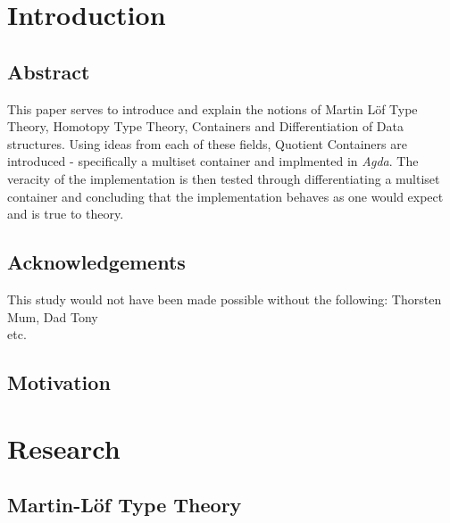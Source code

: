 \documentclass[12pt]{report}
\begin{document}
\part{Introduction}

\chapter{Abstract}


This paper serves to introduce and explain the notions of Martin L\"of Type Theory, Homotopy Type Theory, Containers and Differentiation of Data structures. Using ideas from each of these fields, Quotient Containers are introduced - specifically a multiset container and implmented in \textit{Agda}. The veracity of the implementation is then tested through differentiating a multiset container and concluding that the implementation behaves as one would expect and is true to theory.

\chapter{Acknowledgements}
This study would not have been made possible without the following:
Thorsten\\
Mum, Dad Tony\\
etc.
\chapter{Motivation}

\part{Research}

\chapter{Martin-L\"of Type Theory}
\end{document}
